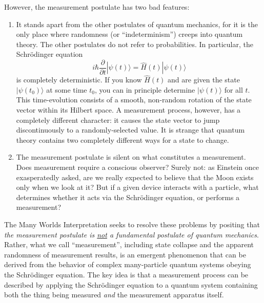 \documentclass[pra,12pt]{revtex4}
\begin{document}
However, the measurement postulate has two bad features:

\begin{enumerate}
\item It stands apart from the other postulates of quantum mechanics,
  for it is the only place where randomness (or ``indeterminism'')
  creeps into quantum theory.  The other postulates do not refer to
  probabilities.  In particular, the Schr\"odinger equation
\begin{equation}
  i\hbar\frac{\partial}{\partial t}|\psi(t)\rangle = \hat{H}(t) |\psi(t)\rangle
\end{equation}
is completely deterministic.  If you know $\hat{H}(t)$ and are given
the state $|\psi(t_0)\rangle$ at some time $t_0$, you can in principle
determine $|\psi(t)\rangle$ for all $t$.  This time-evolution consists
of a smooth, non-random rotation of the state vector within its
Hilbert space.  A measurement process, however, has a completely
different character: it causes the state vector to jump
discontinuously to a randomly-selected value.  It is strange that
quantum theory contains two completely different ways for a state to
change.

\item The measurement postulate is silent on what constitutes a
measurement.  Does measurement require a conscious observer?  Surely
not: as Einstein once exasperatedly asked, are we really expected to
believe that the Moon exists only when we look at it?  But if a given
device interacts with a particle, what determines whether it acts via
the Schr\"odinger equation, or performs a measurement?
\end{enumerate}

The Many Worlds Interpretation seeks to resolve these problems by
positing that \textit{the measurement postulate is \underline{not} a
  fundamental postulate of quantum mechanics}.  Rather, what we call
``measurement'', including state collapse and the apparent randomness
of measurement results, is an emergent phenomenon that can be derived
from the behavior of complex many-particle quantum systems obeying the
Schr\"odinger equation.  The key idea is that a measurement process
can be described by applying the Schr\"odinger equation to a quantum
system containing both the thing being measured \textit{and} the
measurement apparatus itself.
\end{document}
